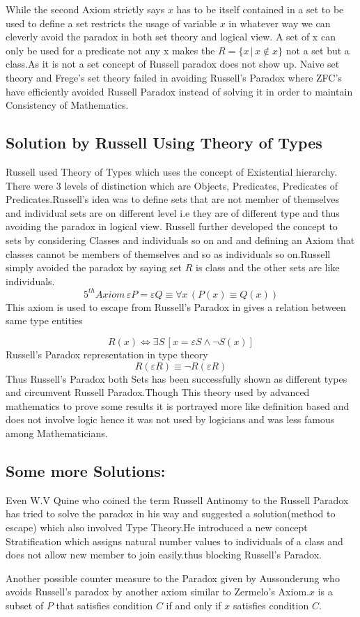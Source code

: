 \documentclass[a4paper]{article}
\begin{document}
\noindent While the second Axiom strictly says $x$ has to be itself
contained in a set to be used to define a set restricts the usage of
variable $x$ in whatever way we can cleverly avoid the paradox in
both set theory and logical view. A set of x can only be used for
a predicate not any x makes the $R=\{x \,|\, x \notin x\}$ not 
a set but a class.As it is not a set concept of Russell paradox
does not show up.
Naive set theory and Frege's set theory failed in avoiding Russell's
Paradox where ZFC's have efficiently avoided Russell Paradox instead of 
solving it in order to maintain Consistency of Mathematics. 

\subsection{Solution by Russell Using Theory of Types}
Russell used Theory of Types which uses the concept of Existential 
hierarchy. There were $3$ levels of distinction which are Objects, 
Predicates, Predicates of Predicates.Russell's idea was to define 
sets that are not member of themselves and individual sets are on 
different level i.e they are of different type and thus avoiding the 
paradox in logical view. Russell further developed the concept to 
sets by considering Classes and individuals so on and and defining 
an Axiom that classes cannot be members of themselves and so as
individuals so on.Russell simply avoided the paradox by saying
set $R$ is class and the other sets are like individuals.
$$5^{th} Axiom \, \varepsilon P=\varepsilon Q \equiv \forall x \,
(P(x)\equiv Q(x))$$
This axiom is used to escape from Russell's Paradox in gives a 
relation between same type entities

\newpage
$$R(x) \iff \exists S\,[x=\varepsilon S \land \neg S(x)]$$
Russell's Paradox representation in type theory
$$R(\varepsilon R) \equiv \neg R(\varepsilon R)$$
Thus Russell's Paradox both Sets has been successfully shown as 
different types and circumvent Russell Paradox.Though This theory
used by advanced mathematics to prove some results it is portrayed
more like definition based and does not involve logic hence it 
was not used by logicians and was less famous among Mathematicians.

\subsection{Some more Solutions:}
Even W.V Quine who coined the term Russell Antinomy to the 
Russell Paradox has tried to solve the paradox in his way and
suggested a solution(method to escape) which also involved Type
Theory.He introduced a new concept Stratification which assigns 
natural number values to individuals of a class and does not allow
new member to join easily.thus blocking Russell's Paradox.
\par \null \par
\noindent Another possible counter measure to the Paradox given by
Aussonderung who avoids Russell's paradox by another axiom similar
to Zermelo's Axiom.$x$ is a subset of $P$ that satisfies condition 
$C$ if and only if $x$ satisfies condition $C$.
\end{document}
